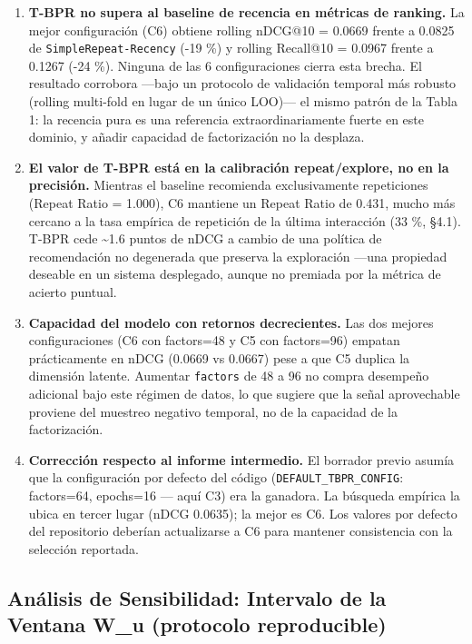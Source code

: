 \documentclass{article}
\begin{document}
\begin{enumerate}
\def\labelenumi{\arabic{enumi}.}
\item
  \textbf{T-BPR no supera al baseline de recencia en métricas de ranking.} La mejor configuración (C6) obtiene rolling nDCG@10 = 0.0669 frente a 0.0825 de \texttt{SimpleRepeat-Recency} (-19 \%) y rolling Recall@10 = 0.0967 frente a 0.1267 (-24 \%). Ninguna de las 6 configuraciones cierra esta brecha. El resultado corrobora ---bajo un protocolo de validación temporal más robusto (rolling multi-fold en lugar de un único LOO)--- el mismo patrón de la Tabla 1: la recencia pura es una referencia extraordinariamente fuerte en este dominio, y añadir capacidad de factorización no la desplaza.
\item
  \textbf{El valor de T-BPR está en la calibración repeat/explore, no en la precisión.} Mientras el baseline recomienda exclusivamente repeticiones (Repeat Ratio = 1.000), C6 mantiene un Repeat Ratio de 0.431, mucho más cercano a la tasa empírica de repetición de la última interacción (33 \%, §4.1). T-BPR cede \textasciitilde1.6 puntos de nDCG a cambio de una política de recomendación no degenerada que preserva la exploración ---una propiedad deseable en un sistema desplegado, aunque no premiada por la métrica de acierto puntual.
\item
  \textbf{Capacidad del modelo con retornos decrecientes.} Las dos mejores configuraciones (C6 con factors=48 y C5 con factors=96) empatan prácticamente en nDCG (0.0669 vs 0.0667) pese a que C5 duplica la dimensión latente. Aumentar \texttt{factors} de 48 a 96 no compra desempeño adicional bajo este régimen de datos, lo que sugiere que la señal aprovechable proviene del muestreo negativo temporal, no de la capacidad de la factorización.
\item
  \textbf{Corrección respecto al informe intermedio.} El borrador previo asumía que la configuración por defecto del código (\texttt{DEFAULT\_TBPR\_CONFIG}: factors=64, epochs=16 --- aquí C3) era la ganadora. La búsqueda empírica la ubica en tercer lugar (nDCG 0.0635); la mejor es C6. Los valores por defecto del repositorio deberían actualizarse a C6 para mantener consistencia con la selección reportada.
\end{enumerate}

\subsection{Análisis de Sensibilidad: Intervalo de la Ventana W\_u (protocolo reproducible)}\label{anuxe1lisis-de-sensibilidad-intervalo-de-la-ventana-w_u-protocolo-reproducible}
\end{document}
